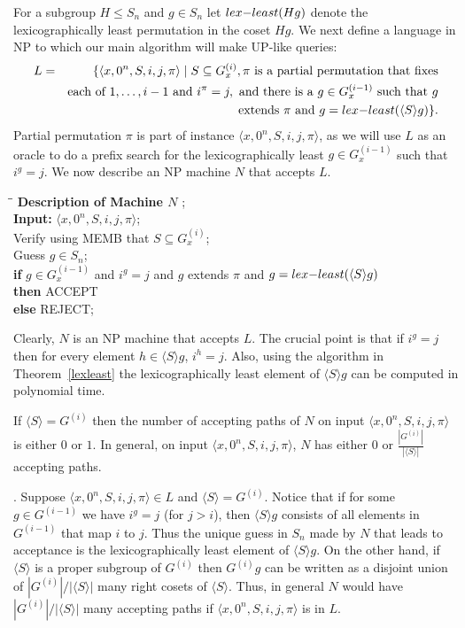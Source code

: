 \documentclass{elsart}
\newcommand{\KW}[1]{{\bf #1}}
\newcommand{\cproof}{\noindent{\it Proof of Claim}}
\newenvironment{claimproof}{\cproof. }{\hspace*{\fill}\vspace{5mm}}
\newcommand{\lexleast}{{\rm{lex{-}least}}}
\renewcommand{\angle}[1]{\langle #1\rangle}
\begin{document}
\begin{pf}
  For a subgroup $H\leq S_n$ and $g\in S_n$ let $\lexleast(Hg)$ denote
  the lexicographically least permutation in the coset $Hg$. We next
  define a language in NP to which our main algorithm will make
  UP-like queries:
\begin{eqnarray*}
  L & = & \{\angle{x,0^n,S,i,j,\pi}\mid S\subseteq G^{(i)}_x, 
  \pi\textrm{ is a partial permutation that fixes}\\ 
  & & \textrm{each of }1,\ldots,i-1\textrm{ and }i^\pi = j,\textrm{ and there is a } 
  g\in G_x^{(i-1)}\textrm{ such that } g\\
  & &  \textrm{ extends }\pi \textrm{ and } g=\lexleast(\angle{S}g)\}.
\end{eqnarray*}
Partial permutation $\pi$ is part of instance
$\angle{x,0^n,S,i,j,\pi}$, as we will use $L$ as an oracle to do a
prefix search for the lexicographically least $g\in G_x^{(i-1)}$ such
that $i^g=j$. We now describe an NP machine $N$ that accepts $L$.
\begin{tabbing}
\quad \=\quad \=\quad     \kill
{\bf Description of Machine $N$ };\\
\KW{Input:} $\angle{x,0^n,S,i,j,\pi}$;\\
Verify using MEMB that $S\subseteq G_x^{(i)}$;\\
\> Guess $g \in S_n$;\\
\> \> \KW{if} $g\in G_x^{(i-1)}$ and $i^g=j$ and $g$ extends $\pi$ and $g = \lexleast(\angle{S}g)$ \\
\> \>        \KW{then} ACCEPT\\
\>\>        \KW{else} REJECT;\\
\end{tabbing}
Clearly, $N$ is an NP machine that accepts $L$. The crucial point is
that if $i^g=j$ then for every element $h\in\angle{S}g$, $i^h=j$.
Also, using the algorithm in Theorem~\ref{lexleast} the
lexicographically least element of $\angle{S}g$ can be computed in
polynomial time.

\begin{claim}\label{claim2}
  If $\angle{S}=G^{(i)}$ then the number of accepting paths of $N$ on
  input $\angle{x,0^n,S,i,j,\pi}$ is either $0$ or $1$. In general, on
  input $\angle{x,0^n,S,i,j,\pi}$, $N$ has either $0$ or
  $\frac{|G^{(i)}|}{|\angle{S}|}$ accepting paths.
\end{claim}

\begin{claimproof} Suppose $\angle{x,0^n,S,i,j,\pi}\in L$ and
  $\angle{S}=G^{(i)}$. Notice that if for some $g\in G^{(i-1)}$ we
  have $i^g=j$ (for $j>i$), then $\angle{S}g$ consists of all elements
  in $G^{(i-1)}$ that map $i$ to $j$. Thus the unique guess in $S_n$
  made by $N$ that leads to acceptance is the lexicographically least
  element of $\angle{S}g$. On the other hand, if $\angle{S}$ is a
  proper subgroup of $G^{(i)}$ then $G^{(i)}g$ can be written as a
  disjoint union of $|G^{(i)}|/|\angle{S}|$ many right cosets of
  $\angle{S}$.  Thus, in general $N$ would have
  $|G^{(i)}|/|\angle{S}|$ many accepting paths if
  $\angle{x,0^n,S,i,j,\pi}$ is in $L$.
\end{claimproof}


\end{pf}
\end{document}
